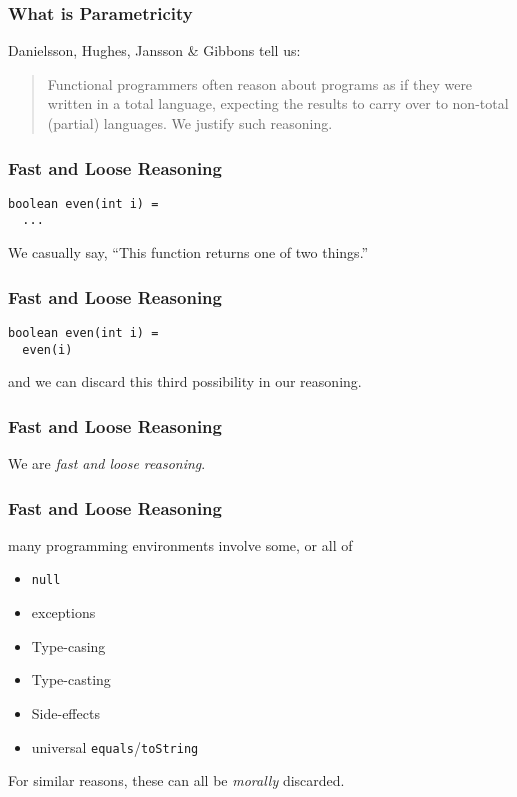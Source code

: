 \begin{frame}
\frametitle{What is Parametricity}
\begin{block}{Danielsson, Hughes, Jansson \& Gibbons \cite{danielsson2006fast} tell us:}
\begin{quotation}
Functional programmers often reason about programs as if
they were written in a total language, expecting the results
to carry over to non-total (partial) languages. We justify
such reasoning.
\end{quotation}
\end{block}
\end{frame}

\begin{frame}[fragile]
\frametitle{Fast and Loose Reasoning}
\begin{lstlisting}
boolean even(int i) =
  ...
\end{lstlisting}
We casually say, ``This function returns one of two things.''
\end{frame}

\begin{frame}[fragile]
\frametitle{Fast and Loose Reasoning}
\begin{lstlisting}
boolean even(int i) =
  even(i)
\end{lstlisting}
and we can discard this third possibility in our reasoning.
\end{frame}

\begin{frame}[fragile]
\frametitle{Fast and Loose Reasoning}
\begin{center}
We are \emph{fast and loose reasoning}.
\end{center}
\end{frame}

\begin{frame}[fragile]
\frametitle{Fast and Loose Reasoning}
\begin{block}{many programming environments involve some, or all of}
\begin{itemize}
  \item \lstinline{null}
  \item exceptions
  \item Type-casing
  \item Type-casting
  \item Side-effects
  \item universal \lstinline{equals}/\lstinline{toString}
\end{itemize}
\end{block}
For similar reasons, these can all be \emph{morally} discarded.
\end{frame}
